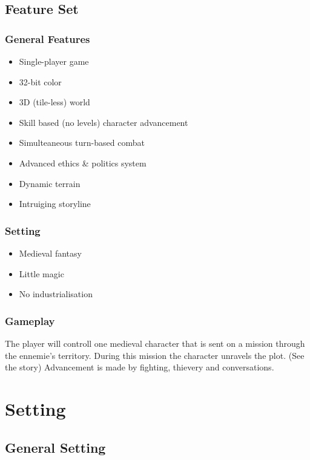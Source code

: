 \documentclass[a4paper]{report}
\begin{document}
	\chapter{Feature Set}

		\section{General Features}

			\begin{itemize}
				\item Single-player game
				\item 32-bit color
				\item 3D (tile-less) world
				\item Skill based (no levels) character advancement
				\item Simulteaneous turn-based combat
				\item Advanced ethics \& politics system
				\item Dynamic terrain
				\item Intruiging storyline
			\end{itemize}

		\section{Setting}\label{setting}

			\begin{itemize}
				\item Medieval fantasy
				\item Little magic
				\item No industrialisation
			\end{itemize}

		\section{Gameplay}

			The player will controll one medieval character that is sent on a mission through the ennemie's territory. During this mission the character unravels the plot. (See the story) Advancement is made by fighting, thievery and conversations.

\part{Setting}

	\chapter{General Setting}
\end{document}
